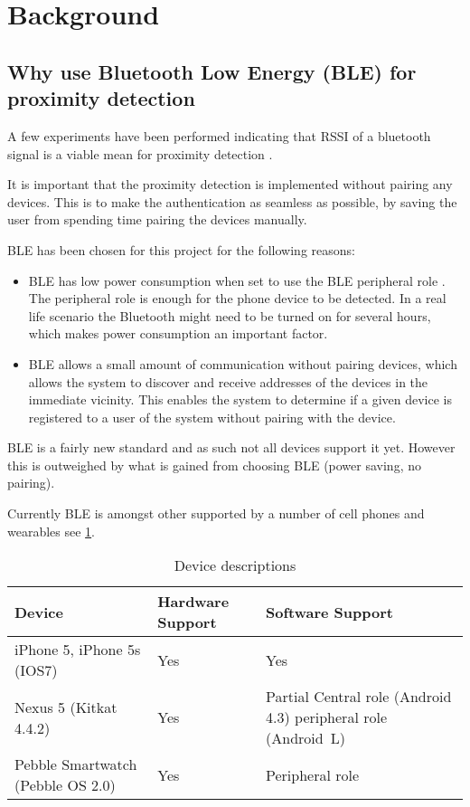 \section{Background}

\subsection{Why use Bluetooth Low Energy (BLE) for proximity detection}

A few experiments have been performed indicating that RSSI of a bluetooth signal is a viable mean for proximity detection \cite{ref:Takashi}. 

It is important that the proximity detection is implemented without pairing any devices. This is to make the authentication as seamless as possible, by saving the user from spending time pairing the devices manually.

BLE has been chosen for this project for the following reasons:
\begin{itemize}
	\item BLE has low power consumption when set to use the BLE peripheral role \cite{ref:Power_usage}. The peripheral role is enough for the phone device to be detected. In a real life scenario the Bluetooth might need to be turned on for several hours, which makes power consumption an important factor.
	\item BLE allows a small amount of communication without pairing devices, which allows the system to discover and receive addresses of the devices in the immediate vicinity. This enables the system to determine if a given device is registered to a user of the system without pairing with the device.
\end{itemize}

BLE is a fairly new standard and as such not all devices support it yet. However this is outweighed by what is gained from choosing BLE (power saving, no pairing). 

Currently BLE is amongst other supported by a number of cell phones and wearables see \cref{table:devices}.

\begin{table}[!t]
\caption{Device descriptions}
\label{table:devices}
\centering
\begin{tabular}{|p{2.3cm}|p{1.3cm}|p{3.9cm}|}
\hline
\textbf{Device} & \textbf{Hardware Support} & \textbf{Software Support}\\
\hline
iPhone 5, iPhone 5s (IOS7) & Yes & Yes\\
\hline
Nexus 5 \newline (Kitkat 4.4.2) & Yes & Partial \newline
Central role (Android 4.3)  \newline
peripheral role (Android~L)\\
\hline
Pebble Smartwatch (Pebble OS 2.0) & Yes & Peripheral role\\
\hline
\end{tabular}
\end{table}

